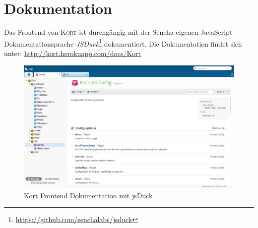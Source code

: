 \section{Dokumentation}

Das Frontend von \textsc{Kort} ist durchgängig mit der Sencha-eigenen JavaScript-Dokumentationsprache \emph{JSDuck}\footnote{\url{https://github.com/senchalabs/jsduck}} dokumentiert.
Die Dokumentation findet sich unter: \url{http://kort.herokuapp.com/docs/Kort}

\begin{figure}[H]
	\centering
	\includegraphics[width=\textwidth]{images/implementation/frontend/kort-documentation}
	\caption{Kort Frontend Dokumentation mit jsDuck}
	\label{image-kort-documentation}
\end{figure}